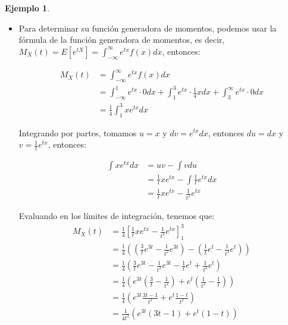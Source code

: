 \documentclass{article}
\theoremstyle{definition}
\newtheorem{example}[definition]{Ejemplo}
\theoremstyle{plain}
\theoremstyle{remark}
\begin{document}
\begin{example}
\begin{itemize}
Y la desviación estándar se calcula de la siguiente manera:
\begin{align*}
\sigma_X &= \sqrt{V(X)} \\
&= \sqrt{\frac{11}{36}} \\
&= \frac{\sqrt{11}}{6} \approx 0.5528
\end{align*}

\item Para determinar su función generadora de momentos, podemos usar la fórmula de la función generadora de momentos, es decir, $M_X(t) = E[e^{tX}] = \int_{-\infty}^{\infty} e^{tx} f(x) dx$, entonces:

\begin{align*}
M_X(t) &= \int_{-\infty}^{\infty} e^{tx} f(x) dx \\
&= \int_{-\infty}^{1} e^{tx} \cdot 0 dx + \int_{1}^{3} e^{tx} \cdot \frac{1}{4} x dx + \int_{3}^{\infty} e^{tx} \cdot 0 dx \\
&= \frac{1}{4} \int_{1}^{3} x e^{tx} dx
\end{align*}

Integrando por partes, tomamos $u = x$ y $dv = e^{tx} dx$, entonces $du = dx$ y $v = \frac{1}{t} e^{tx}$, entonces:

\begin{align*}
\int x e^{tx} dx &= uv - \int v du \\
&= \frac{1}{t} x e^{tx} - \int \frac{1}{t} e^{tx} dx \\
&= \frac{1}{t} x e^{tx} - \frac{1}{t^2} e^{tx}
\end{align*}

Evaluando en los límites de integración, tenemos que:
\begin{align*}
M_X(t) &= \frac{1}{4} \left[ \frac{1}{t} x e^{tx} - \frac{1}{t^2} e^{tx} \right]_{1}^{3} \\
&= \frac{1}{4} \left( \left( \frac{3}{t} e^{3t} - \frac{1}{t^2} e^{3t} \right) - \left( \frac{1}{t} e^{t} - \frac{1}{t^2} e^{t} \right) \right) \\
&= \frac{1}{4} \left( \frac{3}{t} e^{3t} - \frac{1}{t^2} e^{3t} - \frac{1}{t} e^{t} + \frac{1}{t^2} e^{t} \right) \\
&= \frac{1}{4} \left( e^{3t} \left( \frac{3}{t} - \frac{1}{t^2} \right) + e^{t} \left( \frac{1}{t^2} - \frac{1}{t} \right) \right) \\
&= \frac{1}{4} \left( e^{3t} \frac{3t - 1}{t^2} + e^{t} \frac{1 - t}{t^2} \right) \\
&= \frac{1}{4t^2} \left(e^{3t} (3t - 1) + e^{t} (1 - t) \right)
\end{align*}

\end{itemize}

\end{example}
\end{document}
